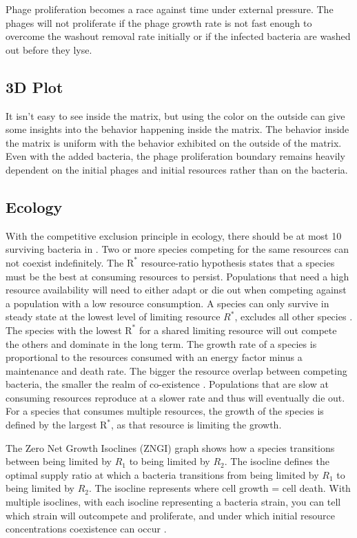 Phage proliferation becomes a race against time under external pressure. 
The phages will not proliferate if the phage growth rate is not fast enough to overcome the washout removal rate initially or if the infected bacteria are washed out before they lyse. 

\subsection{3D Plot}
It isn't easy to see inside the matrix, but using the color on the outside can give some insights into the behavior happening inside the matrix. 
The behavior inside the matrix is uniform with the behavior exhibited on the outside of the matrix. 
Even with the added bacteria, the phage proliferation boundary remains heavily dependent on the initial phages and initial resources rather than on the bacteria. 

\subsection{Ecology}
With the competitive exclusion principle in ecology, there should be at most 10 surviving bacteria in  \cite{hardinCompetitiveExclusionPrinciple1960}. 
Two or more species competing for the same resources can not coexist indefinitely. 
The $\text{R}^{*}$ resource-ratio hypothesis states that a species must be the best at consuming resources to persist. 
Populations that need a high resource availability will need to either adapt or die out when competing against a population with a low resource consumption. 
A species can only survive in steady state at the lowest level of limiting resource $R^{*}$, excludes all other species \cite{juRuleEnergyFlux2009}. 
The species with the lowest $\text{R}^{*}$ for a shared limiting resource will out compete the others and dominate in the long term.
The growth rate of a species is proportional to the resources consumed with an energy factor minus a maintenance and death rate. 
The bigger the resource overlap between competing bacteria, the smaller the realm of co-existence \cite{vandenbergEcologicalModellingApproaches2022}. 
Populations that are slow at consuming resources reproduce at a slower rate and thus will eventually die out. 
For a species that consumes multiple resources, the growth of the species is defined by the largest $\text{R}^{*}$, as that resource is limiting the growth. 

The Zero Net Growth Isoclines (ZNGI) graph shows how a species transitions between being limited by $R_1$ to being limited by $R_2$. 
The isocline defines the optimal supply ratio at which a bacteria transitions from being limited by $R_1$ to being limited by $R_2$. 
The isocline represents where cell growth = cell death. 
With multiple isoclines, with each isocline representing a bacteria strain, you can tell which strain will outcompete and proliferate, and under which initial resource concentrations coexistence can occur \cite{smithEffectsResourceSupplies2002}.